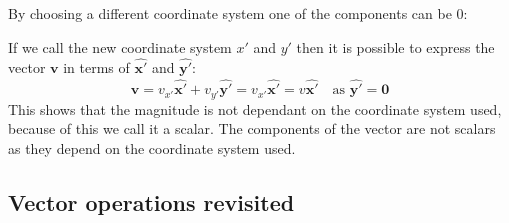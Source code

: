 \documentclass{article}
\renewcommand{\vec}[1]{\bm{#1}}
\begin{document}
By choosing a different coordinate system one of the components can be 0:
\begin{center}
\end{center}
If we call the new coordinate system \(x'\) and \(y'\) then it is possible to express the vector \(\vec v\) in terms of \(\vec{\hat{x'}}\) and \(\vec{\hat{y'}}\):
\[\vec v=v_{x'}\vec{\hat{x'}}+v_{y'}\vec{\hat{y'}}=v_{x'}\vec{\hat{x'}}=v\vec{\hat{x'}}\quad \text{as }\vec{\hat{y'}}=\vec 0\]
This shows that the magnitude is not dependant on the coordinate system used, because of this we call it a scalar. The components of the vector are not scalars as they depend on the coordinate system used.

\subsection*{Vector operations revisited}
\end{document}
